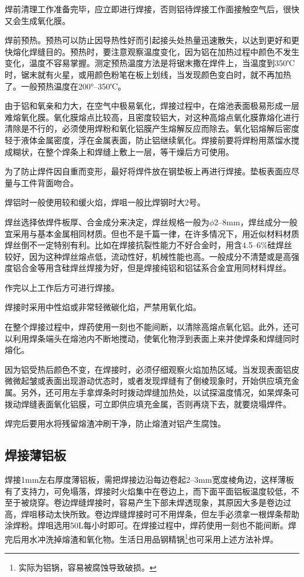 \documentclass{ctexbook}
\begin{document}
焊前清理工作准备完毕，应立即进行焊接，否则铝待焊接工作面接触空气后，很快又会生成氧化膜。

焊前预热。预热可以防止因导热性好而引起接头处热量迅速散失，以达到更好和更快熔化焊缝目的。预热时，要注意观察温度变化，因为铝在加热过程中颜色不发生变化，温度不容易掌握。测定预热温度方法是将锯末撒在焊件上，当温度到350℃时，锯末就有火星，或用颜色粉笔在板上划线，当发现颜色变白时，就不再加热了。一般预热温度在200°--350℃。

由于铝和氧亲和力大，在空气中极易氧化，焊接过程中，在熔池表面极易形成一层难熔氧化膜。氧化膜熔点比较高，且密度较铝大，对这种高熔点氧化膜靠熔化进行清除是不行的，必须使用焊粉和氧化铝膜产生熔解反应而除去。氧化铝熔解后密度轻于液体金属密度，浮在金属表面，防止铝继续氧化。焊接前要将焊粉用蒸馏水搅成糊状，在整个焊条上和焊缝上敷上一层，等干燥后方可使用。

为了防止焊件因自重而变形，最好将焊件放在钢垫板上再进行焊接。垫板表面应尽量与工件背面吻合。

焊铝时一般使用较和缓火焰，焊咀一般比焊钢时大2号。

焊丝选择依焊件板厚、合金成分来决定，焊丝规格一般为$\phi$2--8mm，焊丝成分一般宜采用与基本金属相同材质。但也不是千篇一律，在许多情况下，用近似材料材质焊丝倒不一定特别有利。比如在焊接抗裂性能力不好合金时，用含4.5--6\%硅焊丝较好，因为这种焊丝熔点低，流动性好，机械性能也高。一般成分不清楚或是高强度铝合金等用含硅焊丝焊接为好，但是焊接纯铝和铝锰系合金宜用同材料焊丝。

作完以上工作后方可进行焊接。

焊接时采用中性焰或非常轻微碳化焰，严禁用氧化焰。

在整个焊接过程中，焊药使用一刻也不能间断，以清除高熔点氧化铝。此外，还可以利用焊条端头在熔池内不断地搅动，使氧化物浮到表面上来并使焊条和焊缝同时熔化。

因为铝受热后颜色不变，在焊接时，必须仔细观察火焰加热区域。当发现表面铝皮微微起皱或表面出现游动优态时，或者发现焊缝有了倒棱现象时，开始供应填充金属。另外，还可用左手拿焊条时时拨动焊缝加热处，以试探温度情况，如杲焊条可拨动焊缝表面氧化铝膜，可立即供应填充金属，否则再烧下去，就要烧塌焊件。

焊完后要用水将残留熔渣冲刷干净，防止熔渣对铝产生腐蚀。
\subsection{焊接薄铝板}
焊接1mm左右厚度薄铝板，需把焊接边沿每边卷起2--3mm宽度棱角边，这样薄板有了支持力，可免塌落，焊接时火焰集中在卷边上，而下面平面铝板温度较低，不至于被烧穿。卷边焊缝焊接时，容易产生下部未焊透现象，其原因大多是卷边过高，焊咀移动太快所致。卷边焊缝焊接时可不用焊条，但左手必须拿一根焊条帮助涂焊粉。焊咀选用50L每小时即可。在焊接过程中，焊药使用一刻也不能间断。焊完后用水冲洗掉熔渣和氧化物。生活日用品钢精锅\footnote{实际为铝锅，容易被腐蚀导致破损。}也可采用上述方法补焊。
\end{document}

